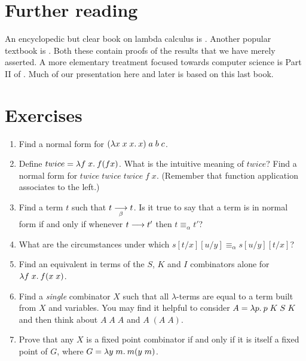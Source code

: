 %
%
%

\section*{Further reading}

An encyclopedic but clear book on lambda calculus is .
Another popular textbook is . Both these contain proofs
of the results that we have merely asserted. A more elementary treatment
focused towards computer science is Part II of . Much of our
presentation here and later is based on this last book.

\section*{Exercises}

\begin{enumerate}

\item Find a normal form for $(\lambda x\; x\; x.\: x)\; a\; b\; c$.

\item Define $twice = \lambda f\; x.\: f(f x)$. What is the intuitive meaning of
$twice$? Find a normal form for $twice\; twice\; twice\; f\; x$. (Remember that
function application associates to the left.)

\item Find a term $t$ such that $t \mathrel{\mathop{\longrightarrow}\limits_{\beta}} t$. Is it true to say that a term is
in normal form if and only if whenever $t \longrightarrow t'$ then $t \equiv_{\alpha}
t'$?

\item What are the circumstances under which $s [t/x] [u/y] \equiv_{\alpha} s
[u/y] [t/x]$?

\item Find an equivalent in terms of the $S$, $K$ and $I$ combinators alone for
$\lambda f\; x.\: f(x\; x)$.

\item Find a {\em single} combinator $X$ such that all $\lambda$-terms are
equal to a term built from $X$ and variables. You may find it helpful to
consider $A = \lambda p.\: p\; K\; S\; K$ and then think about $A\; A\; A$ and $A\;
(A\; A)$.

\item Prove that any $X$ is a fixed point combinator if and only if it is
itself a fixed point of $G$, where $G = \lambda y\; m.\: m(y\; m)$.

\end{enumerate}
